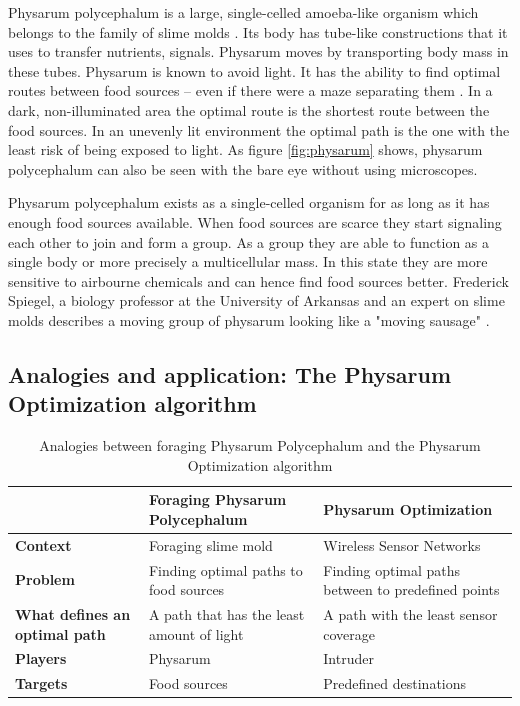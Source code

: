 \documentclass[cameraready]{IWORK2014}
\begin{document}
Physarum polycephalum is a large, single-celled amoeba-like organism which belongs to the family of slime molds \cite{liu2012physarum}. Its body has tube-like constructions that it uses to transfer nutrients, signals. Physarum moves by transporting body mass in these tubes. Physarum is known to avoid light. It has the ability to find optimal routes between food sources -- even if there were a maze separating them \cite{nakagaki2000intelligence}. In a dark, non-illuminated area the optimal route is the shortest route between the food sources. In an unevenly lit environment the optimal path is the one with the least risk of being exposed to light. As figure \ref{fig:physarum} shows, physarum polycephalum can also be seen with the bare eye without using microscopes.

Physarum polycephalum exists as a single-celled organism for as long as it has enough food sources available. When food sources are scarce they start signaling each other to join and form a group. As a group they are able to function as a single body or more precisely a multicellular mass. In this state they are more sensitive to airbourne chemicals and can hence find food sources better. Frederick Spiegel, a biology professor at the University of Arkansas and an expert on slime molds describes a moving group of physarum looking like a "moving sausage" \cite{spiegel2012slimemold}.

\subsection{Analogies and application: The Physarum Optimization algorithm}

\begin{table}
	\begin{tabularx}{0.90\textwidth}{|X|X|X|}
		\hline & \textbf{Foraging Physarum Polycephalum} & \textbf{Physarum Optimization} \\ \hline
		\textbf{Context} & Foraging slime mold & Wireless Sensor Networks \\ \hline
		\textbf{Problem} & Finding optimal paths to food sources & Finding optimal paths between to predefined points \\ \hline
		\textbf{What defines an optimal path} & A path that has the least amount of light & A path with the least sensor coverage \\ \hline
		\textbf{Players} & Physarum & Intruder \\ \hline
		\textbf{Targets} & Food sources & Predefined destinations \\ \hline
	\end{tabularx}
	\caption{Analogies between foraging Physarum Polycephalum and the Physarum Optimization algorithm}
	\label{tbl:analogies_physarum}
\end{table}
\end{document}
